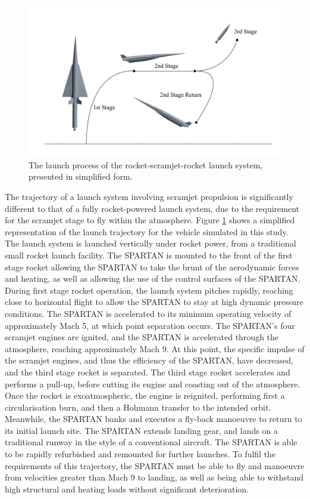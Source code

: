 \begin{figure}[ht]
	\centering
	\includegraphics[width=0.9\linewidth]{figures/3_vehicle_design/Trajsimple}
	\caption{The launch process of the rocket-scramjet-rocket launch system, presented in simplified form.}
	\label{fig:Trajsimple}
\end{figure}


 The trajectory of a launch system involving scramjet propulsion is significantly different to that of a fully rocket-powered launch system, due to the requirement for the scramjet stage to fly within the atmosphere.
 Figure \ref{fig:Trajsimple} shows a simplified representation of the launch trajectory for the vehicle simulated in this study.
 The launch system is launched vertically under rocket power, from a traditional small rocket launch facility. The SPARTAN is mounted to the front of the first stage rocket allowing the SPARTAN to take the brunt of the aerodynamic forces and heating, as well as allowing the use of the control surfaces of the SPARTAN. During first stage rocket operation, the launch system pitches rapidly, reaching close to horizontal flight to allow the SPARTAN to stay at high dynamic pressure conditions. The SPARTAN is accelerated to its minimum operating velocity of approximately Mach 5, at which point separation occurs. The SPARTAN's four scramjet engines are ignited, and the SPARTAN is accelerated through the atmosphere, reaching approximately Mach 9. At this point, the specific impulse of the scramjet engines, and thus the efficiency of the SPARTAN, have decreased, and the third stage rocket is separated. The third stage rocket accelerates and performs a pull-up, before cutting its engine and coasting out of the atmosphere. Once the rocket is exoatmospheric, the engine is reignited, performing first a circularisation burn, and then a Hohmann transfer to the intended orbit. Meanwhile, the SPARTAN banks and executes a fly-back manoeuvre to return to its initial launch site. The SPARTAN extends landing gear, and lands on a traditional runway in the style of a conventional aircraft. The SPARTAN is able to be rapidly refurbished and remounted for further launches. To fulfil the requirements of this trajectory, the SPARTAN must be able to fly and manoeuvre from velocities greater than Mach 9 to landing, as well as being able to withstand high structural and heating loads without significant deterioration.
 
